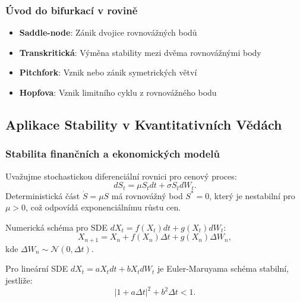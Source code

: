 \subsubsection{Úvod do bifurkací v rovině}

\begin{definition}
\begin{itemize}
\item \textbf{Saddle-node}: Zánik dvojice rovnovážných bodů
\item \textbf{Transkritická}: Výměna stability mezi dvěma rovnovážnými body  
\item \textbf{Pitchfork}: Vznik nebo zánik symetrických větví
\item \textbf{Hopfova}: Vznik limitního cyklu z rovnovážného bodu
\end{itemize}
\end{definition}

\spc

\subsection{Aplikace Stability v Kvantitativních Vědách}

\subsubsection{Stabilita finančních a ekonomických modelů}

\begin{application}
Uvažujme stochastickou diferenciální rovnici pro cenový proces:
\[
dS_t = \mu S_t dt + \sigma S_t dW_t.
\]
Deterministická část $\dot{S} = \mu S$ má rovnovážný bod $S^* = 0$, který je nestabilní pro $\mu > 0$, což odpovídá exponenciálnímu růstu cen.
\end{application}

\begin{definition}
Numerická schéma pro SDE $dX_t = f(X_t)dt + g(X_t)dW_t$:
\[
X_{n+1} = X_n + f(X_n)\Delta t + g(X_n)\Delta W_n,
\]
kde $\Delta W_n \sim \mathcal{N}(0, \Delta t)$.
\end{definition}

\begin{theorem}
Pro lineární SDE $dX_t = aX_t dt + bX_t dW_t$ je Euler-Maruyama schéma stabilní, jestliže:
\[
|1 + a\Delta t|^2 + b^2\Delta t < 1.
\]
\end{theorem}

